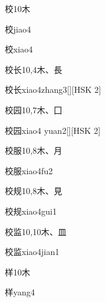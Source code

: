 \begin{entry}{校}{10}{⽊}
  \begin{phonetics}{校}{jiao4}
  \end{phonetics}
  \begin{phonetics}{校}{xiao4}
  \end{phonetics}
\end{entry}

\begin{entry}{校长}{10,4}{⽊、⾧}
  \begin{phonetics}{校长}{xiao4zhang3}[][HSK 2]
  \end{phonetics}
\end{entry}

\begin{entry}{校园}{10,7}{⽊、⼞}
  \begin{phonetics}{校园}{xiao4 yuan2}[][HSK 2]
  \end{phonetics}
\end{entry}

\begin{entry}{校服}{10,8}{⽊、⽉}
  \begin{phonetics}{校服}{xiao4fu2}
  \end{phonetics}
\end{entry}

\begin{entry}{校规}{10,8}{⽊、⾒}
  \begin{phonetics}{校规}{xiao4gui1}
  \end{phonetics}
\end{entry}

\begin{entry}{校监}{10,10}{⽊、⽫}
  \begin{phonetics}{校监}{xiao4jian1}
  \end{phonetics}
\end{entry}

\begin{entry}{样}{10}{⽊}
  \begin{phonetics}{样}{yang4}
  \end{phonetics}
\end{entry}


